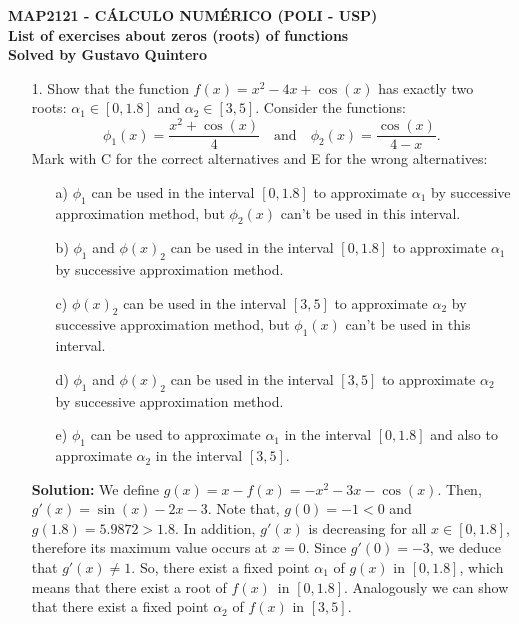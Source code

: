 \documentclass[11pt,a4paper]{report}
\begin{document}
\begin{center}
\textbf{MAP2121 - CÁLCULO NUMÉRICO (POLI - USP)}\\
\textbf{List of exercises about zeros (roots) of functions}\\
\textbf{Solved by Gustavo Quintero}
\end{center}
\begin{itemize}
\item[1.] Show that the function $f(x)=x^2 - 4x + \cos(x)$ has exactly two roots: $\alpha_1\in [0,1.8]$ and $\alpha_2\in [3,5]$. Consider the functions:
\begin{equation*}
\phi_1(x) = \dfrac{x^2 + \cos(x)}{4}\quad\text{and}\quad\phi_2(x)=\dfrac{\cos(x)}{4-x}.
\end{equation*}
Mark with C for the correct alternatives and E for the wrong alternatives:
\begin{itemize}
\item[a)] $\phi_1$ can be used in the interval $[0,1.8]$ to approximate $\alpha_1$ by successive approximation method, but $\phi_2(x)$ can't be used in this interval.
\item[b)] $\phi_1$ and $\phi(x)_2$ can be used in the interval $[0,1.8]$  to approximate $\alpha_1$ by successive approximation method.
\item[c)] $\phi(x)_2$ can be used in the interval $[3,5]$  to approximate $\alpha_2$ by successive approximation method, but $\phi_1(x)$ can't be used in this interval.
\item[d)]  $\phi_1$ and $\phi(x)_2$ can be used in the interval $[3,5]$  to approximate $\alpha_2$ by successive approximation method.
\item[e)]  $\phi_1$ can be used to approximate $\alpha_1$  in the interval $[0,1.8]$ and also to approximate $\alpha_2$  in the interval $[3,5]$.
\end{itemize}
\textbf{Solution:} We define $g(x) = x - f(x) = -x^2 - 3x - \cos(x)$. Then, $g'(x) = \sin(x) - 2x - 3$. Note that, $g(0)=-1<0$ and $g(1.8) = 5.9872>1.8$. In addition, $g'(x)$ is decreasing for all $x\in[0,1.8]$, therefore its maximum value occurs at $x = 0$. Since $g'(0)=-3$,  we deduce that $g'(x)\neq 1$. So, there exist a fixed point $\alpha_1$ of $g(x)$ in $[0,1.8]$, which means that there exist a root of $f(x)$~in $[0,1.8]$. Analogously we can show that there exist a fixed point $\alpha_2$ of $f(x)$ in $[3,5]$.
\end{itemize}
\end{document}
